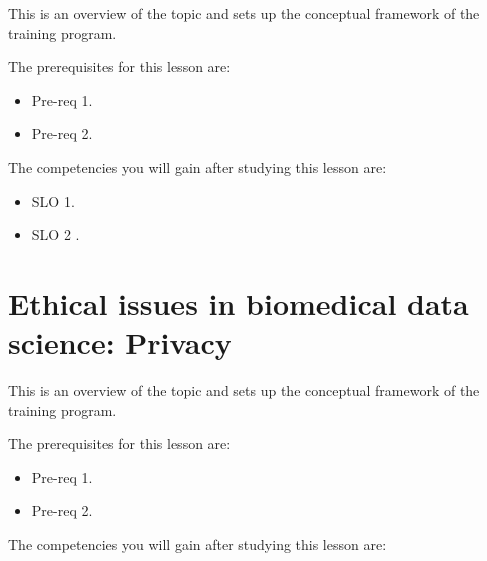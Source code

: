 This is an overview of the topic and sets up the conceptual framework of the training program.




The prerequisites for this lesson are: 




\begin{itemize}
    \item Pre-req 1.
\end{itemize}

\begin{itemize}
    \item Pre-req 2.
\end{itemize}




The competencies you will gain after studying this lesson are: 




\begin{itemize}
    \item SLO 1.
\end{itemize}

\begin{itemize}
    \item SLO 2 .
\end{itemize}

\section{Ethical issues in biomedical data science: Privacy}
\label{sec:ethical-issues-in-biomedical-data-science-privacy}

This is an overview of the topic and sets up the conceptual framework of the training program.




The prerequisites for this lesson are: 




\begin{itemize}
    \item Pre-req 1.
\end{itemize}

\begin{itemize}
    \item Pre-req 2.
\end{itemize}




The competencies you will gain after studying this lesson are: 




